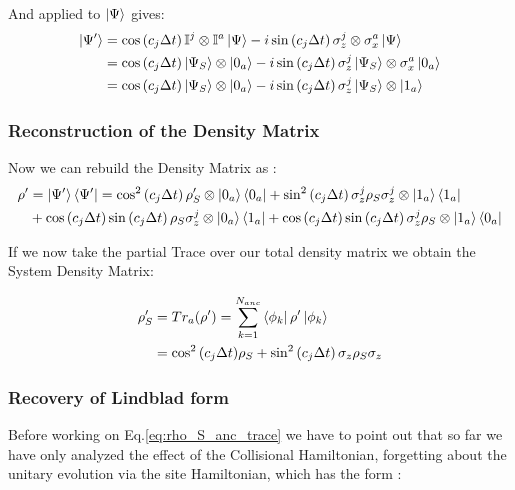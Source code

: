 \documentclass[a4paper,12pt]{article}
\begin{document}
	And applied to $ \ket{\Psi} $ gives:
	\begin{align}
		\ket{\Psi'} &= \cos \left(c_j \Delta t \right) \mathbb{I}^j \otimes \mathbb{I}^a \ket{\Psi} - i \sin \left(c_j \Delta t \right) \sigma_{z}^{j} \otimes \sigma_{x}^{a} \ket{\Psi} \notag \\
		&= \cos \left(c_j \Delta t \right) \ket{\Psi_S} \otimes \ket{0_a} - i \sin \left(c_j \Delta t \right) \sigma_{z}^{j} \ket{\Psi_S} \otimes \sigma_{x}^{a} \ket{0_a} \notag \\
		&= \cos \left(c_j \Delta t \right) \ket{\Psi_S} \otimes \ket{0_a} - i \sin \left(c_j \Delta t \right) \sigma_{z}^{j} \ket{\Psi_S} \otimes \ket{1_a}
		\label{eq:psi_evo_QJ}
	\end{align}

	\subsubsection{Reconstruction of the Density Matrix}
	\label{sub:Reconstruction_of_the_Density_Matrix_QJ}
	Now we can rebuild the Density Matrix as :
	\begin{align}
		\rho' &= \ket{\Psi'}\bra{\Psi'} = \cos^{2} \left(c_j \Delta t \right) \rho_S' \otimes \ket{0_a}\bra{0_a} + \sin^{2} \left(c_j \Delta t \right) \sigma_{z}^{j} \rho_S \sigma_{z}^{j} \otimes \ket{1_a}\bra{1_a} \notag \\
		&+ \cos \left(c_j \Delta t \right) \sin \left(c_j \Delta t \right) \rho_S \sigma_{z}^{j} \otimes \ket{0_a} \bra{1_a} + \cos \left(c_j \Delta t \right) \sin \left(c_j \Delta t \right) \sigma_{z}^{j} \rho_S \otimes \ket{1_a} \bra{0_a}
		\label{eq:rho_reconstruction}
	\end{align}

	\begin{flushleft}
		If we now take the partial Trace over our total density matrix we obtain the System Density Matrix:
	\end{flushleft}

	\begin{align}
		\rho'_S & = Tr_a(\rho') = \sum_{k=1}^{N_{anc}}{\bra{\phi_k}\rho'\ket{\phi_k}} \notag \\
		&= \cos^{2}{\left(c_{j} \Delta t\right)} \rho_S + \sin^{2}{\left(c_{j} \Delta t\right)} \, \sigma_{z} \rho_S \sigma_{z}
		\label{eq:rho_S_anc_trace}
	\end{align}

	\subsubsection{Recovery of Lindblad form}
	\label{sub:Recovery_of_Lindblad_form_QJ}
	Before working on Eq.\ref{eq:rho_S_anc_trace} we have to point out that so far we have only analyzed the effect of the Collisional Hamiltonian, forgetting about the unitary evolution via the site Hamiltonian, which has the form :
\end{document}
